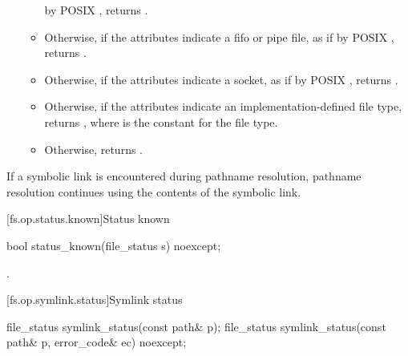 \begin{itemdescr}
\begin{itemize}
\begin{itemize}
      by POSIX , returns .
\item Otherwise, if the attributes indicate a fifo or pipe file, as if by
      POSIX , returns .
\item Otherwise, if the attributes indicate a socket, as if by POSIX
      , returns .
\item Otherwise, if the attributes indicate an implementation-defined
      file type,
      returns ,
      where  is the constant for the
       file type.
\item Otherwise, returns .
\end{itemize}
\end{itemize}

\pnum
\remarks
If a symbolic link is encountered during pathname resolution,
      pathname resolution continues using the contents of the symbolic link.
\end{itemdescr}


[fs.op.status.known]{Status known}

%
\begin{itemdecl}
bool status_known(file_status s) noexcept;
\end{itemdecl}

\begin{itemdescr}
\pnum
\returns
{}.
\end{itemdescr}


[fs.op.symlink.status]{Symlink status}

%
\begin{itemdecl}
file_status symlink_status(const path& p);
file_status symlink_status(const path& p, error_code& ec) noexcept;
\end{itemdecl}

